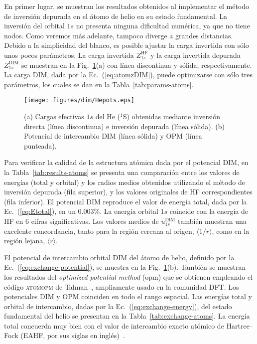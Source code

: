 En primer lugar, se muestran los resultados obtenidos al implementar
el método de inversión depurada en el átomo de helio en su estado
fundamental. La inversión del orbital $1s$ no presenta ninguna 
dificultad numérica, ya que no tiene nodos. Como veremos más adelante, 
tampoco diverge a grandes distancias. Debido a la simplicidad del 
blanco, es posible ajustar la carga invertida con sólo unos pocos 
parámetros. La carga invertida $Z_{1s}^{\mathrm{HF}}$ y la carga 
invertida depurada $Z_{1s}^{\mathrm{DIM}}$ se muestran en la 
Fig.~\ref{fig:Hepots}(a) con línea discontinua y sólida, 
respectivamente. La carga DIM, dada por la Ec.~(\ref{eq:atomzDIM}), 
puede optimizarse con sólo tres parámetros, los cuales se dan en la 
Tabla~\ref{tab:params-atoms}. 

\begin{figure}[t]
\centering
\texttt{[image: figures/dim/Hepots.eps]}
\caption[Cargas efectivas y potencial de intercambio DIM de He.]
{(a) Cargas efectivas $1s$ del He ($^1$S) obtenidas mediante inversión 
directa (línea discontinua) e inversión depurada (línea sólida). 
(b) Potencial de intercambio DIM (línea sólida) y OPM (línea punteada).}
\label{fig:Hepots}
\end{figure}

Para verificar la calidad de la estructura atómica dada por el potencial 
DIM, en la Tabla~\ref{tab:results-atoms} se presenta una comparación 
entre los valores de energías (total y orbital) y los radios medios 
obtenidos utilizando el método de inversión depurada (fila superior), y  
los valores originales de HF correspondientes (fila inferior). El 
potencial DIM reproduce el valor de energía total, dada por la 
Ec.~(\ref{eq:Etotal}), en un $0.003\%$. La energía orbital $1s$ coincide 
con la energía de HF en 6 cifras significativas. Los valores medios de 
$u_{1s}^{\mathrm{DIM}}$ también muestran una excelente concordancia, 
tanto para la región cercana al origen, $\langle 1/r\rangle$, como en la 
región lejana, $\langle r\rangle$.

El potencial de intercambio orbital DIM del átomo de helio, definido por 
la Ec.~(\ref{eq:exchange-potential}), se muestra en la 
Fig.~\ref{fig:Hepots}(b). También se muestran los resultados del 
\textit{optimized potential method} (\acs{opm}) que se obtienen 
empleando el código \textsc{atomopm} de Talman~\cite{Talman:76,
Talman:89}, ampliamente usado en la comunidad DFT. Los potenciales DIM y 
OPM coinciden en todo el rango espacial. Las energías total y orbital de 
intercambio, dadas por la Ec.~(\ref{eq:exchange-energy}), del estado 
fundamental del helio se presentan en la Tabla~\ref{tab:exchange-atoms}. 
La energía total concuerda muy bien con el valor de intercambio exacto 
atómico de Hartree--Fock (EAHF, por sus siglas en 
inglés)~\cite{Becke:88}.

